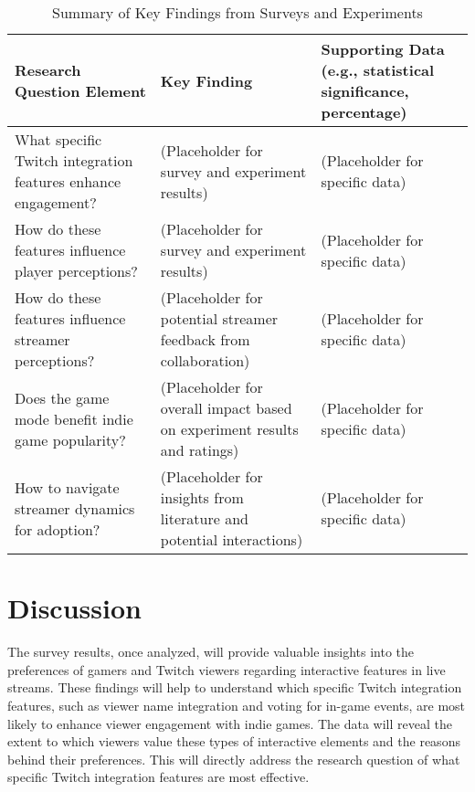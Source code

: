 \documentclass[conference]{IEEEtran}
\begin{document}
\begin{table}[h]
\centering
\caption{Summary of Key Findings from Surveys and Experiments}
\begin{tabular}{|p{4cm}|p{4cm}|p{4cm}|}
\hline
Research Question Element & Key Finding & Supporting Data (e.g., statistical significance, percentage) \\
\hline
What specific Twitch integration features enhance engagement? & (Placeholder for survey and experiment results) & (Placeholder for specific data) \\
How do these features influence player perceptions? & (Placeholder for survey and experiment results) & (Placeholder for specific data) \\
How do these features influence streamer perceptions? & (Placeholder for potential streamer feedback from collaboration) & (Placeholder for specific data) \\
Does the game mode benefit indie game popularity? & (Placeholder for overall impact based on experiment results and ratings) & (Placeholder for specific data) \\
How to navigate streamer dynamics for adoption? & (Placeholder for insights from literature and potential interactions) & (Placeholder for specific data) \\
\hline
\end{tabular}
\end{table}

\section{Discussion}\label{sec:discussion}

The survey results, once analyzed, will provide valuable insights into the preferences of gamers and Twitch viewers regarding interactive features in live streams. These findings will help to understand which specific Twitch integration features, such as viewer name integration and voting for in-game events, are most likely to enhance viewer engagement with indie games. The data will reveal the extent to which viewers value these types of interactive elements and the reasons behind their preferences. This will directly address the research question of what specific Twitch integration features are most effective.
\end{document}
